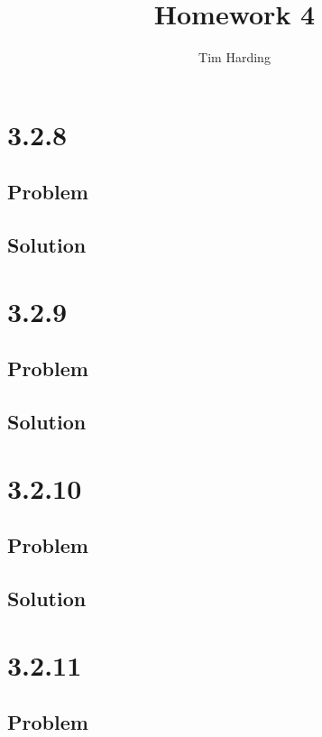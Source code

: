 \documentclass[12pt]{article}
\title{Homework 4}
\author{Tim Harding}
\begin{document}
\maketitle

\section*{3.2.8}

\subsection*{Problem}

\subsection*{Solution}



\section*{3.2.9}

\subsection*{Problem}

\subsection*{Solution}




\section*{3.2.10}

\subsection*{Problem}

\subsection*{Solution}




\section*{3.2.11}

\subsection*{Problem}
\end{document}
